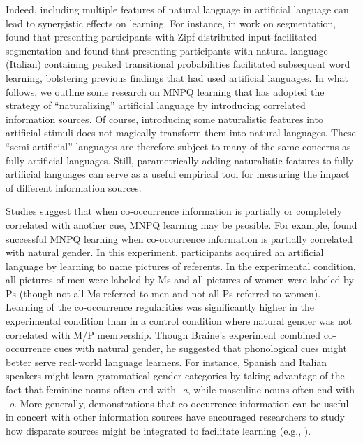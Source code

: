 \documentclass[man,floatsintext]{apa6}
\begin{document}
Indeed, including multiple features of natural language in artificial language can lead to synergistic effects on learning.
For instance, in work on segmentation, \citet{kurumada13} found that presenting participants with Zipf-distributed input facilitated segmentation and \citet{hay11} found that presenting participants with natural language (Italian) containing peaked transitional probabilities facilitated subsequent word learning, bolstering previous findings that had used artificial languages.
In what follows, we outline some research on MNPQ learning that has adopted the strategy of ``naturalizing'' artificial language by introducing correlated information sources.
Of course, introducing some naturalistic features into artificial stimuli does not magically transform them into natural languages.
These ``semi-artificial'' languages are therefore subject to many of the same concerns as fully artificial languages.
Still, parametrically adding naturalistic features to fully artificial languages can serve as a useful empirical tool for measuring the impact of different information sources.

Studies suggest that when co-occurrence information is partially or completely correlated with another cue, MNPQ learning may be psosible. For example, \citet{braine1987} found successful MNPQ learning when co-occurrence information is partially correlated with natural gender. In this experiment, participants acquired an artificial language by learning to name pictures of referents. In the experimental condition, all pictures of men were labeled by Ms and all pictures of women were labeled by Ps (though not all Ms referred to men and not all Ps referred to women). Learning of the co-occurrence regularities was significantly higher in the experimental condition than in a control condition where natural gender was not correlated with M/P membership. Though Braine's experiment combined co-occurrence cues with natural gender, he suggested that phonological cues might better serve real-world language learners. For instance, Spanish and Italian speakers might learn grammatical gender categories by taking advantage of the fact that feminine nouns often end with \emph{-a}, while masculine nouns often end with \emph{-o}. More generally, demonstrations that co-occurrence information can be useful in concert with other information sources have encouraged researchers to study how disparate sources might be integrated to facilitate learning (e.g., \citealp{monaghan2005, johns2012}).
\end{document}
